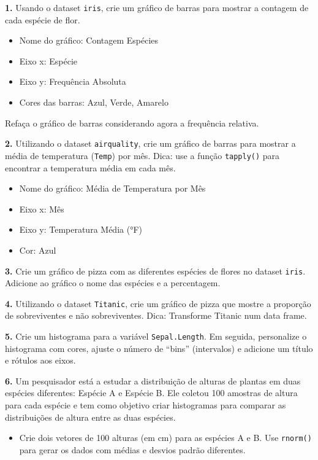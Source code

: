 \documentclass[
]{book}
\providecommand{\tightlist}{%
  \setlength{\itemsep}{0pt}\setlength{\parskip}{0pt}}
\begin{document}
\textbf{1.} Usando o dataset \texttt{iris}, crie um gráfico de barras para mostrar a
contagem de cada espécie de flor.

\begin{itemize}
\tightlist
\item
  Nome do gráfico: Contagem Espécies
\item
  Eixo x: Espécie
\item
  Eixo y: Frequência Absoluta
\item
  Cores das barras: Azul, Verde, Amarelo
\end{itemize}

Refaça o gráfico de barras considerando agora a frequência relativa.

\textbf{2.} Utilizando o dataset \texttt{airquality}, crie um gráfico de barras para
mostrar a média de temperatura (\texttt{Temp}) por mês. Dica: use a função
\texttt{tapply()} para encontrar a temperatura média em cada mês.

\begin{itemize}
\tightlist
\item
  Nome do gráfico: Média de Temperatura por Mês
\item
  Eixo x: Mês
\item
  Eixo y: Temperatura Média (°F)
\item
  Cor: Azul
\end{itemize}

\textbf{3.} Crie um gráfico de pizza com as diferentes espécies de flores no
dataset \texttt{iris}. Adicione ao gráfico o nome das espécies e a percentagem.

\textbf{4.} Utilizando o dataset \texttt{Titanic}, crie um gráfico de pizza que
mostre a proporção de sobreviventes e não sobreviventes. Dica:
Transforme Titanic num data frame.

\textbf{5.} Crie um histograma para a variável \texttt{Sepal.Length}. Em seguida,
personalize o histograma com cores, ajuste o número de ``bins''
(intervalos) e adicione um título e rótulos aos eixos.

\textbf{6.} Um pesquisador está a estudar a distribuição de alturas de plantas em duas espécies diferentes: Espécie A e Espécie B. Ele coletou 100 amostras de altura para cada espécie e tem como objetivo criar histogramas para comparar as distribuições de altura entre as duas espécies.

\begin{itemize}
\tightlist
\item
  Crie dois vetores de 100 alturas (em cm) para as espécies A e B. Use \texttt{rnorm()} para gerar os dados com médias e desvios padrão diferentes.
\end{itemize}
\end{document}
